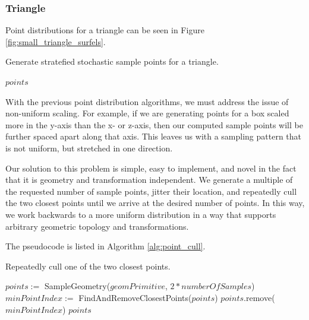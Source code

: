 \subsubsection{Triangle}
\label{sec:triangle_point_gen}
Point distributions for a triangle can be seen in Figure \ref{fig:small_triangle_surfels}.

\begin{algorithm}[H]
\captionfont
\caption[Triangle point generation]{Generate stratefied stochastic sample points for a triangle.}
\label{alg:triangle_point_gen}
\begin{algorithmic}
   \State \Return $points$
   \EndFunction
\end{algorithmic}
\end{algorithm}

With the previous point distribution algorithms, we must address the issue of non-uniform scaling. For example, if we are generating points for a box scaled more in the y-axis than the x- or z-axis, then our computed sample points will be further spaced apart along that axis. This leaves us with a sampling pattern that is not uniform, but stretched in one direction.

Our solution to this problem is simple, easy to implement, and novel in the fact that it is geometry and transformation independent. We generate a multiple of the requested number of sample points, jitter their location, and repeatedly cull the two closest points until we arrive at the desired number of points. In this way, we work backwards to a more uniform distribution in a way that supports arbitrary geometric topology and transformations.

The pseudocode is listed in Algorithm \ref{alg:point_cull}.

\begin{algorithm}
\captionfont
\caption[Closest point culling]{Repeatedly cull one of the two closest points.}
\label{alg:point_cull}
\begin{algorithmic}
      \State $points :=$ SampleGeometry($geomPrimitive$, $2*numberOfSamples$)
         \State $minPointIndex :=$ FindAndRemoveClosestPoints($points$)
         \State $points$.remove($minPointIndex$)
      \EndWhile
      \State \Return $points$
   \EndFunction
\end{algorithmic}
\end{algorithm}

